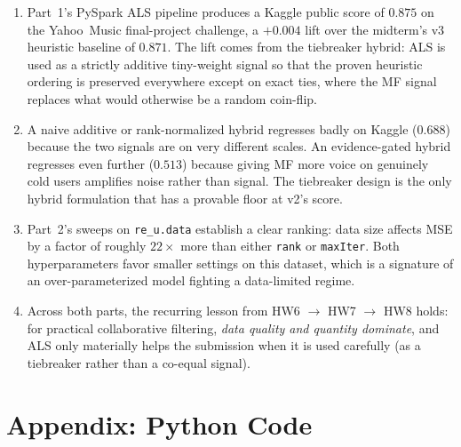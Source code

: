 \documentclass[12pt]{article}
\begin{document}
	\begin{enumerate}
		\item Part~1's PySpark ALS pipeline produces a Kaggle public score of $0.875$ on the Yahoo~Music final-project challenge, a $+0.004$ lift over the midterm's v3 heuristic baseline of $0.871$. The lift comes from the tiebreaker hybrid: ALS is used as a strictly additive tiny-weight signal so that the proven heuristic ordering is preserved everywhere except on exact ties, where the MF signal replaces what would otherwise be a random coin-flip.

		\item A naive additive or rank-normalized hybrid regresses badly on Kaggle ($0.688$) because the two signals are on very different scales. An evidence-gated hybrid regresses even further ($0.513$) because giving MF more voice on genuinely cold users amplifies noise rather than signal. The tiebreaker design is the only hybrid formulation that has a provable floor at v2's score.

		\item Part~2's sweeps on \texttt{re\_u.data} establish a clear ranking: data size affects MSE by a factor of roughly $22\times$ more than either \texttt{rank} or \texttt{maxIter}. Both hyperparameters favor smaller settings on this dataset, which is a signature of an over-parameterized model fighting a data-limited regime.

		\item Across both parts, the recurring lesson from HW6 $\rightarrow$ HW7 $\rightarrow$ HW8 holds: for practical collaborative filtering, \emph{data quality and quantity dominate}, and ALS only materially helps the submission when it is used carefully (as a tiebreaker rather than a co-equal signal).
	\end{enumerate}

	\newpage
	\section{Appendix: Python Code}

	

	\newpage
	\vspace{1em}

	
\end{document}

